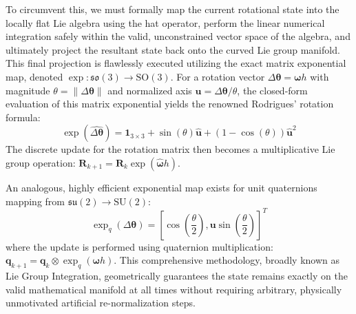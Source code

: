 To circumvent this, we must formally map the current rotational state into the locally flat Lie algebra using the hat operator, perform the linear numerical integration safely within the valid, unconstrained vector space of the algebra, and ultimately project the resultant state back onto the curved Lie group manifold. This final projection is flawlessly executed utilizing the exact matrix exponential map, denoted $\exp: \mathfrak{so}(3) \to \text{SO}(3)$. For a rotation vector $\Delta\bm{\theta} = \bm{\omega} h$ with magnitude $\theta = \|\Delta\bm{\theta}\|$ and normalized axis $\bm{u} = \Delta\bm{\theta} / \theta$, the closed-form evaluation of this matrix exponential yields the renowned Rodrigues' rotation formula:
\begin{equation}
    \exp(\widehat{\Delta\bm{\theta}}) = \bm{1}_{3\times3} + \sin(\theta) \widehat{\bm{u}} + (1 - \cos(\theta)) \widehat{\bm{u}}^2
\end{equation}
The discrete update for the rotation matrix then becomes a multiplicative Lie group operation: $\bm{R}_{k+1} = \bm{R}_k \exp(\widehat{\bm{\omega}} h)$. 

An analogous, highly efficient exponential map exists for unit quaternions mapping from $\mathfrak{su}(2) \to \text{SU}(2)$:
\begin{equation}
    \exp_{q}(\Delta\bm{\theta}) = \left[ \cos\left(\frac{\theta}{2}\right), \bm{u} \sin\left(\frac{\theta}{2}\right) \right]^T
\end{equation}
where the update is performed using quaternion multiplication: $\bm{q}_{k+1} = \bm{q}_k \otimes \exp_{q}(\bm{\omega} h)$. This comprehensive methodology, broadly known as Lie Group Integration, geometrically guarantees the state remains exactly on the valid mathematical manifold at all times without requiring arbitrary, physically unmotivated artificial re-normalization steps.

